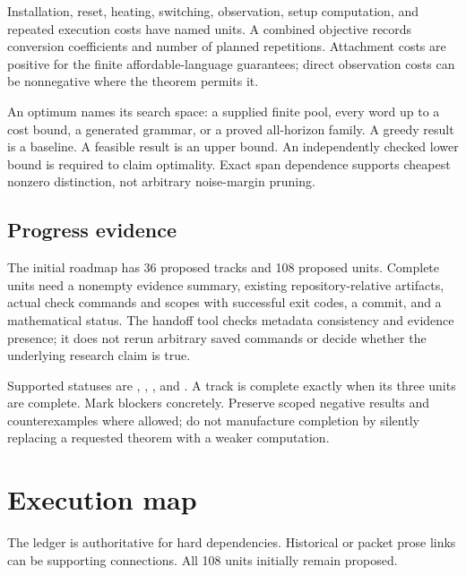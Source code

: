 \documentclass[
  11pt,
  a4paper,
]{report}
\let\nxtexttt\texttt
\renewcommand{\texttt}[1]{\nxtexttt{\seqsplit{#1}}}
\begin{document}
Installation, reset, heating, switching, observation, setup computation,
and repeated execution costs have named units. A combined objective
records conversion coefficients and number of planned repetitions.
Attachment costs are positive for the finite affordable-language
guarantees; direct observation costs can be nonnegative where the
theorem permits it.

An optimum names its search space: a supplied finite pool, every word up
to a cost bound, a generated grammar, or a proved all-horizon family. A
greedy result is a baseline. A feasible result is an upper bound. An
independently checked lower bound is required to claim optimality. Exact
span dependence supports cheapest nonzero distinction, not arbitrary
noise-margin pruning.

\hypertarget{progress-evidence}{%
\section{Progress evidence}\label{progress-evidence}}

The initial roadmap has 36 proposed tracks and 108 proposed units.
Complete units need a nonempty evidence summary, existing
repository-relative artifacts, actual check commands and scopes with
successful exit codes, a commit, and a mathematical status. The handoff
tool checks metadata consistency and evidence presence; it does not
rerun arbitrary saved commands or decide whether the underlying research
claim is true.

Supported statuses are \texttt{proposed}, \texttt{in\_progress},
\texttt{blocked}, and \texttt{complete}. A track is complete exactly
when its three units are complete. Mark blockers concretely. Preserve
scoped negative results and counterexamples where allowed; do not
manufacture completion by silently replacing a requested theorem with a
weaker computation.

\hypertarget{execution-map}{%
\chapter{Execution map}\label{execution-map}}

The ledger is authoritative for hard dependencies. Historical or packet
prose links can be supporting connections. All 108 units initially
remain proposed.
\end{document}
